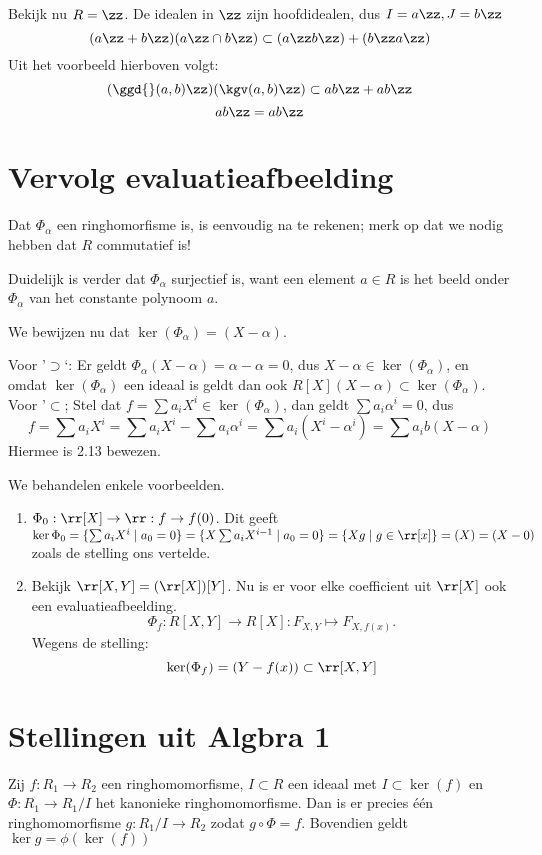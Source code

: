 \documentclass[a4paper,12pt,oneside]{book}
\begin{document}
\begin{voorbeeld}
Bekijk nu $R=\zz$. De idealen in $\zz$ zijn hoofdidealen, dus $I = a\zz, J=b\zz$
\[
(a\zz+b\zz)(a\zz \cap b\zz) \subset (a\zz b\zz)+(b\zz a\zz)
\]
Uit het voorbeeld hierboven volgt:
\[
(\ggd{}(a,b) \zz)(\kgv(a,b) \zz) \subset ab\zz + ab\zz
\]
\[
ab\zz  = ab\zz
\]
\end{voorbeeld}

\section{Vervolg evaluatieafbeelding}

\begin{bewijs}
Dat $\Phi_{\alpha}$ een ringhomorfisme is, is eenvoudig na te rekenen; merk op dat we nodig hebben dat $R$
commutatief is! 

Duidelijk is verder dat $\Phi_{\alpha}$ surjectief is, want een element $a \in R$ is het beeld onder $\Phi_{\alpha}$
van het constante polynoom $a$.

We bewijzen nu dat $\ker(\Phi_{\alpha} ) = (X - \alpha)$. 

Voor '$\supset$`: Er geldt $\Phi_{\alpha} (X - \alpha) = \alpha - \alpha = 0$, dus
$X - \alpha \in \ker(\Phi_{\alpha})$, en omdat $\ker(\Phi_{\alpha} )$ een ideaal is geldt dan ook $R[X](X - \alpha) \subset \ker(\Phi_{\alpha} )$.
Voor  '$\subset$; Stel dat $f =\sum a_i X^i \in \ker(\Phi_{\alpha} )$, dan geldt $\sum a_i \alpha^i = 0$, dus
$$
f = \sum a_i X^i  = \sum a_i X^i - \sum a_i \alpha^i = \sum a_i (X^i - \alpha^i) = \sum a_i b (X-\alpha)
$$
 Hiermee is 2.13 bewezen.
\end{bewijs}

\begin{voorbeeld} We behandelen enkele voorbeelden.
\begin{enumerate}
\item $\Phi_0 : \rr[X] \to \rr : f \to f(0)$.
Dit geeft $\ker \Phi_0 = \{\sum a_i X^i \mid a_0 = 0\}  = \{X \sum a_i X^{i-1} \mid a_0 = 0\} = \{Xg \mid g \in \rr[x]\} = (X) = (X - 0)$ zoals de stelling ons vertelde.
\item Bekijk $\rr[X,Y] = (\rr[X])[Y]$. Nu is er voor elke coefficient uit $\rr[X]$ ook een evaluatieafbeelding. 
$$\Phi_f : R[X,Y] \to R[X] : F_{X,Y} \mapsto F_{X,f(x)}.$$ Wegens de stelling:
$$ \ker (\Phi_f) = (Y - f(x)) \subset \rr[X,Y]$$
\end{enumerate}
\end{voorbeeld}

\section{Stellingen uit Algbra 1}
\begin{stelling}
Zij $f : R_1 \to R_2$ een ringhomomorfisme, $I \subset R$ een ideaal met $I \subset \ker(f)$ en $\Phi : R_1 \to R_1/I$ het kanonieke ringhomomorfisme. Dan is er precies \'e\'en ringhomomorfisme $g : R_1/I \to R_2$ zodat $g \circ \Phi = f$. Bovendien geldt $\ker g = \phi(\ker(f))$
\end{stelling}
\end{document}
